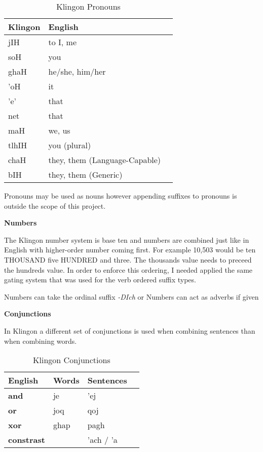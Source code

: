 \documentclass[11pt]{article}
\begin{document}
	\begin{table}[h]
	\begin{center}
	\begin{tabular}{lll}
	\toprule
	\bf Klingon & \bf English \\
	\midrule
	jIH & to I, me \\
	soH & you \\
	ghaH & he/she, him/her \\
	'oH & it \\
	'e' & that \\
	net & that \\
	maH & we, us \\
	tlhIH & you (plural) \\
	chaH & they, them (Language-Capable) \\
	bIH & they, them (Generic) \\
	\bottomrule
	\end{tabular}
	\end{center}
	\caption{Klingon Pronouns}
	\end{table}
	
Pronouns may be used as nouns however appending suffixes to pronouns is outside the scope of this project.

\textbf{Numbers}

The Klingon number system is base ten and numbers are combined just like in English with higher-order number coming first. For example 10,503 would be ten THOUSAND five HUNDRED and three. The thousands value needs to preceed the hundreds value. In order to enforce this ordering, I needed applied the same gating system that was used for the verb ordered suffix types.

Numbers can take the ordinal suffix \textit{-DIch} or 
Numbers can act as adverbs if given 

\textbf{Conjunctions}

In Klingon a different set of conjunctions is used when combining sentences than when combining words.

	\begin{table}[h]
	\begin{center}
	\begin{tabular}{llll}
	\toprule
	\bf English & \bf Words & \bf Sentences \\
	\midrule
	\bf and & je & 'ej \\
	\bf or & joq & qoj \\
	\bf xor & ghap & pagh \\
	\bf constrast & & 'ach / 'a \\
	\bottomrule
	\end{tabular}
	\end{center}
	\caption{Klingon Conjunctions}
	\end{table}
\end{document}

